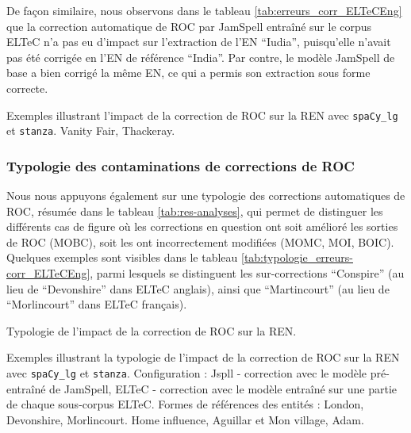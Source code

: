 De façon similaire, nous observons dans le tableau \ref{tab:erreurs_corr_ELTeCEng} que la correction automatique de ROC par JamSpell entraîné sur le corpus ELTeC n'a pas eu d'impact sur l'extraction de l'EN ``Iudia'', puisqu'elle n'avait pas été corrigée en l'EN de référence ``India''. Par contre, le modèle JamSpell de base a bien corrigé la même EN, ce qui a permis son extraction sous forme correcte.
\begin{table}[h!]
\small
    \centering
   
    \caption{Exemples illustrant l'impact de la correction de ROC sur la REN avec \texttt{spaCy\_lg} et \texttt{stanza}. {\normalfont Vanity Fair}, Thackeray.}
    \label{tab:erreurs_corr_ELTeCEng}
\end{table}


\subsubsection{Typologie des contaminations de corrections de ROC}
Nous nous appuyons également sur une typologie des corrections automatiques de ROC, résumée dans le tableau \ref{tab:res-analyses}, qui permet de distinguer les différents cas de figure où les corrections en question ont soit amélioré les sorties de ROC (MOBC), soit les ont incorrectement modifiées (MOMC, MOI, BOIC). Quelques exemples sont visibles dans le tableau \ref{tab:typologie_erreurs-corr_ELTeCEng}, 
parmi lesquels se distinguent les sur-corrections ``Conspire'' 
(au lieu de ``Devonshire'' 
dans ELTeC anglais), ainsi que ``Martincourt'' (au lieu de ``Morlincourt'' dans ELTeC français).



\begin{table}[h!]
\small
    \centering
    
    \caption{Typologie de l'impact de la correction de ROC sur la REN.  }
    \label{tab:res-analyses}
\end{table}

\begin{table}[h!]
\small
    \centering
   
    \caption{Exemples illustrant la typologie de l'impact de la correction de ROC sur la REN avec \texttt{spaCy\_lg} et \texttt{stanza}. Configuration : Jspll - correction avec le modèle pré-entraîné de JamSpell, ELTeC - correction avec le modèle entraîné sur une partie de chaque sous-corpus ELTeC. Formes de références des entités : London, Devonshire, Morlincourt. {\normalfont Home influence}, Aguillar et {\normalfont Mon village}, Adam.}
    \label{tab:typologie_erreurs-corr_ELTeCEng}
\end{table}

